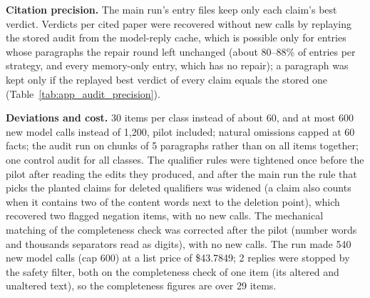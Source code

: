 \documentclass{article} %
\begin{document}
\textbf{Citation precision.} The main run's entry files keep only each claim's best verdict. Verdicts per cited paper were recovered without new calls by replaying the stored audit from the model-reply cache, which is possible only for entries whose paragraphs the repair round left unchanged (about 80--88\% of entries per strategy, and every memory-only entry, which has no repair); a paragraph was kept only if the replayed best verdict of every claim equals the stored one (Table~\ref{tab:app_audit_precision}).

\textbf{Deviations and cost.} 30 items per class instead of about 60, and at most 600 new model calls instead of 1,200, pilot included; natural omissions capped at 60 facts; the audit run on chunks of 5 paragraphs rather than on all items together; one control audit for all classes. The qualifier rules were tightened once before the pilot after reading the edits they produced, and after the main run the rule that picks the planted claims for deleted qualifiers was widened (a claim also counts when it contains two of the content words next to the deletion point), which recovered two flagged negation items, with no new calls. The mechanical matching of the completeness check was corrected after the pilot (number words and thousands separators read as digits), with no new calls. The run made 540 new model calls (cap 600) at a list price of \$43.7849; 2 replies were stopped by the safety filter, both on the completeness check of one item (its altered and unaltered text), so the completeness figures are over 29 items.
\end{document}

